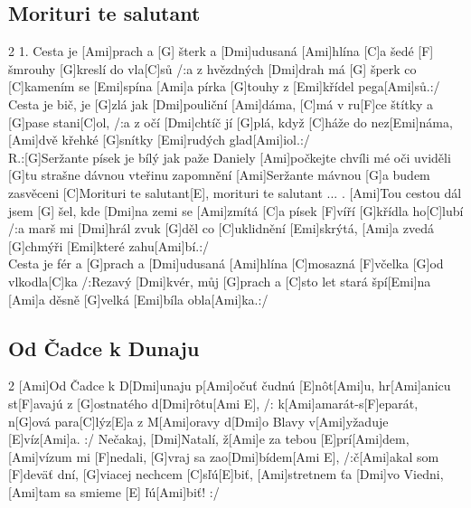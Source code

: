 \documentclass[12pt]{article}
\begin{document}
\subsection{Morituri te salutant}
\begin{multicols}{2}
	1.
	Cesta je [Ami]prach a [G] šterk a [Dmi]udusaná [Ami]hlína 
	[C]a šedé [F] šmrouhy [G]kreslí do vla[C]sů
	/:a z hvězdných [Dmi]drah má [G] šperk 
	co [C]kamením se [Emi]spína 
	[Ami]a pírka [G]touhy z [Emi]křídel pega[Ami]sů.:/	
	\\
	Cesta je bič, je [G]zlá jak [Dmi]pouliční [Ami]dáma, 
	[C]má v ru[F]ce štítky a [G]pase stani[C]ol, 
	/:a z očí [Dmi]chtíč jí [G]plá, když [C]háže do nez[Emi]náma, 
	[Ami]dvě křehké [G]snítky [Emi]rudých glad[Ami]iol.:/
	\\
	R.:[G]Seržante písek je bílý jak paže Daniely
	[Ami]počkejte chvíli mé oči uviděli
	[G]tu strašne dávnou vteřinu zapomnění	
	[Ami]Seržante mávnou [G]a budem zasvěceni	
	[C]Morituri te salutant[E], morituri te salutant ...
	.
	[Ami]Tou cestou dál jsem [G] šel, 
	kde [Dmi]na zemi se [Ami]zmítá	
	[C]a písek [F]víří [G]křídla ho[C]lubí 
	/:a marš mi [Dmi]hrál	zvuk [G]děl 
	co [C]uklidnění [Emi]skrýtá,	
	[Ami]a zvedá [G]chmýři [Emi]které zahu[Ami]bí.:/	
	\\	
	[Ami]Cesta je fér a [G]prach a [Dmi]udusaná [Ami]hlína	
	[C]mosazná [F]včelka [G]od vlkodla[C]ka	
	/:Rezavý [Dmi]kvér, můj [G]prach a [C]sto let stará špí[Emi]na	
	[Ami]a děsně [G]velká [Emi]bíla obla[Ami]ka.:/
\end{multicols}

\subsection{Od Čadce k Dunaju}
\begin{multicols}{2}
	[Ami]Od Čadce k D[Dmi]unaju p[Ami]očuť čudnú [E]nôt[Ami]u,
	hr[Ami]anicu st[F]avajú z [G]ostnatého d[Dmi]rôtu[Ami E],
	/: k[Ami]amarát-s[F]eparát, n[G]ová para[C]lýz[E]a
	z M[Ami]oravy d[Dmi]o Blavy v[Ami]yžaduje [E]víz[Ami]a. :/
	\columnbreak
	[Ami]Nečakaj, [Dmi]Natalí, ž[Ami]e za tebou [E]prí[Ami]dem,
	[Ami]vízum mi [F]nedali, [G]vraj sa zao[Dmi]bídem[Ami E],
	/:č[Ami]akal som [F]deväť dní, [G]viacej nechcem [C]sľú[E]biť,
	[Ami]stretnem ťa [Dmi]vo Viedni, [Ami]tam sa smieme [E] ľú[Ami]biť! :/
\end{multicols}
\end{document}
